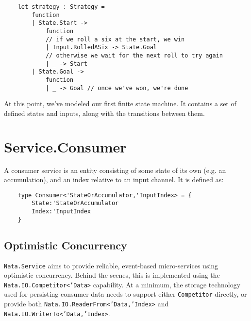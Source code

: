 \documentclass{article}
\begin{document}
\begin{verbatim}
    let strategy : Strategy =
        function
        | State.Start ->
            function
            // if we roll a six at the start, we win
            | Input.RolledASix -> State.Goal 
            // otherwise we wait for the next roll to try again
            | _ -> Start
        | State.Goal ->
            function
            | _ -> Goal // once we've won, we're done
\end{verbatim}

At this point, we've modeled our first finite state machine.  It contains a set of defined states and inputs, along with the transitions between them.



\clearpage
\section{Service.Consumer}

A consumer service is an entity consisting of some state of its own (e.g. an accumulation), and an index relative to an input channel.  It is defined as:

\begin{verbatim}
    type Consumer<'StateOrAccumulator,'InputIndex> = {
        State:'StateOrAccumulator
        Index:'InputIndex
    }
\end{verbatim}

\subsection{Optimistic Concurrency}

\texttt{Nata.Service} aims to provide reliable, event-based micro-services using optimistic concurrency.  Behind the scenes, this is implemented using the \texttt{Nata.IO.Competitor<'Data>} capability.  At a minimum, the storage technology used for persisting consumer data needs to support either \texttt{Competitor} directly, or provide both \texttt{Nata.IO.ReaderFrom<'Data,'Index>} and \texttt{Nata.IO.WriterTo<'Data,'Index>}.
\end{document}
